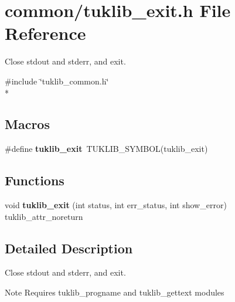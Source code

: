 \section{common/tuklib\-\_\-exit.h File Reference}
\label{tuklib__exit_8h}


Close stdout and stderr, and exit.  


{\ttfamily \#include \char`\"{}tuklib\-\_\-common.\-h\char`\"{}}\\*
\subsection*{Macros}
\begin{DoxyCompactItemize}
\item 
\#define {\bfseries tuklib\-\_\-exit}~T\-U\-K\-L\-I\-B\-\_\-\-S\-Y\-M\-B\-O\-L(tuklib\-\_\-exit)\label{tuklib__exit_8h_a463463145398257c5a1a159d739c3688}

\end{DoxyCompactItemize}
\subsection*{Functions}
\begin{DoxyCompactItemize}
\item 
void {\bfseries tuklib\-\_\-exit} (int status, int err\-\_\-status, int show\-\_\-error) tuklib\-\_\-attr\-\_\-noreturn\label{tuklib__exit_8h_a811e4c214fc69f126517e2e0699c3b5b}

\end{DoxyCompactItemize}


\subsection{Detailed Description}
Close stdout and stderr, and exit. \begin{DoxyNote}{Note}
Requires tuklib\-\_\-progname and tuklib\-\_\-gettext modules 
\end{DoxyNote}
